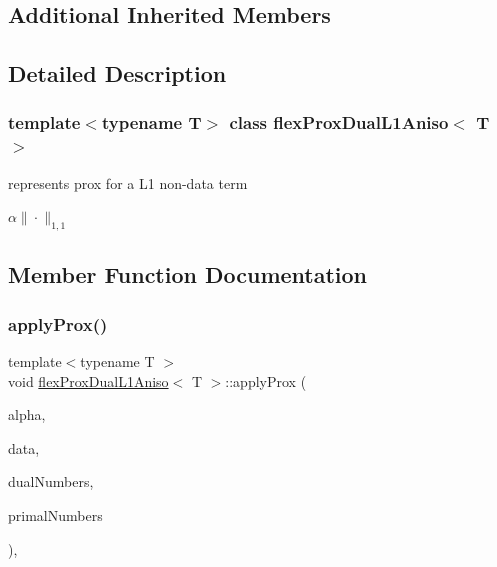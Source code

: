\subsection*{Additional Inherited Members}


\subsection{Detailed Description}
\subsubsection*{template$<$typename T$>$\newline
class flex\+Prox\+Dual\+L1\+Aniso$<$ T $>$}

represents prox for a L1 non-\/data term 

$ \alpha \|\cdot\|_{1,1} $ 

\subsection{Member Function Documentation}
\mbox{\label{classflex_prox_dual_l1_aniso_afef01f75247ba5a8990c5b77a7ab89f0}} 
\subsubsection{\texorpdfstring{apply\+Prox()}{applyProx()}\hspace{0.1cm}{\footnotesize\ttfamily [1/2]}}
{\footnotesize\ttfamily template$<$typename T $>$ \\
void \hyperlink{classflex_prox_dual_l1_aniso}{flex\+Prox\+Dual\+L1\+Aniso}$<$ T $>$\+::apply\+Prox (\begin{DoxyParamCaption}\item[{T}]{alpha,  }\item[{\hyperlink{classflex_box_data}{flex\+Box\+Data}$<$ T $>$ $\ast$}]{data,  }\item[{const std\+::vector$<$ int $>$ \&}]{dual\+Numbers,  }\item[{const std\+::vector$<$ int $>$ \&}]{primal\+Numbers }\end{DoxyParamCaption})\hspace{0.3cm}{\ttfamily [inline]}, {\ttfamily [virtual]}}



